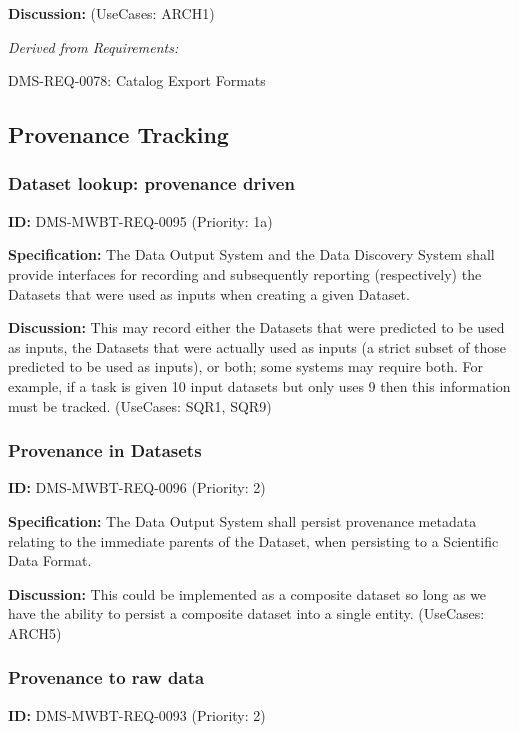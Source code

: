 \documentclass[SE,toc,lsstdraft]{lsstdoc}
\begin{document}
\textbf{Discussion:}
(UseCases: ARCH1)

\emph{Derived from Requirements:}

DMS-REQ-0078:
Catalog Export Formats \newline

\subsection{Provenance Tracking}

\subsubsection{Dataset lookup: provenance driven}

\label{DMS-MWBT-REQ-0095}
\textbf{ID:} DMS-MWBT-REQ-0095 (Priority: 1a)

\textbf{Specification:}
The Data Output System and the Data Discovery System shall provide interfaces for recording and subsequently reporting (respectively) the Datasets that were used as inputs when creating a given Dataset.

\textbf{Discussion:}
This may record either the Datasets that were predicted to be used as inputs, the Datasets that were actually used as inputs (a strict subset of those predicted to be used as inputs), or both; some systems may require both. For example, if a task is given 10 input datasets but only uses 9 then this information must be tracked.  (UseCases: SQR1, SQR9)

\subsubsection{Provenance in Datasets}

\label{DMS-MWBT-REQ-0096}
\textbf{ID:} DMS-MWBT-REQ-0096 (Priority: 2)

\textbf{Specification:}
The Data Output System shall persist provenance metadata relating to the immediate parents of the Dataset, when persisting to a Scientific Data Format.

\textbf{Discussion:}
This could be implemented as a composite dataset so long as we have the ability to persist a composite dataset into a single entity. (UseCases: ARCH5)

\subsubsection{Provenance to raw data}

\label{DMS-MWBT-REQ-0093}
\textbf{ID:} DMS-MWBT-REQ-0093 (Priority: 2)
\end{document}
